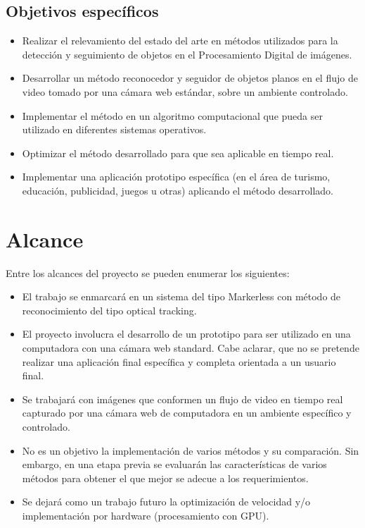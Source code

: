 \documentclass[a4paper,11pt,spanish]{article}
\begin{document}
\subsection{Objetivos específicos}
\begin{itemize}
	\item Realizar el relevamiento del estado del arte en métodos utilizados para la detección y seguimiento de objetos en el Procesamiento Digital de imágenes.
	\item Desarrollar un método reconocedor y seguidor de objetos planos en el flujo de video tomado por una cámara web estándar, sobre un ambiente controlado.
	\item Implementar el método en un algoritmo computacional que pueda ser utilizado en diferentes sistemas operativos.
	\item Optimizar el método desarrollado para que sea aplicable en tiempo real.
	\item Implementar una aplicación prototipo específica (en el área de turismo, educación, publicidad, juegos u otras) aplicando el método desarrollado.
\end{itemize}

\section{Alcance}
Entre los alcances del proyecto se pueden enumerar los siguientes:
\begin{itemize}
  \item El trabajo se enmarcará en un sistema del tipo Markerless con método de reconocimiento del tipo optical tracking.
  \item El proyecto involucra el desarrollo de un prototipo para ser utilizado en una computadora con una cámara web standard. 
	Cabe aclarar, que no se pretende realizar una aplicación final específica y completa orientada a un usuario final.
  \item Se trabajará con imágenes que conformen un flujo de video en tiempo real capturado por una cámara web de computadora en un ambiente específico y controlado.
  \item No es un objetivo la implementación de varios métodos y su comparación. Sin embargo, en una etapa previa se evaluarán las características de varios métodos para obtener el que mejor se adecue a los requerimientos.
  \item Se dejará como un trabajo futuro la optimización de velocidad y/o implementación por hardware (procesamiento con GPU).
\end{itemize}
\end{document}
